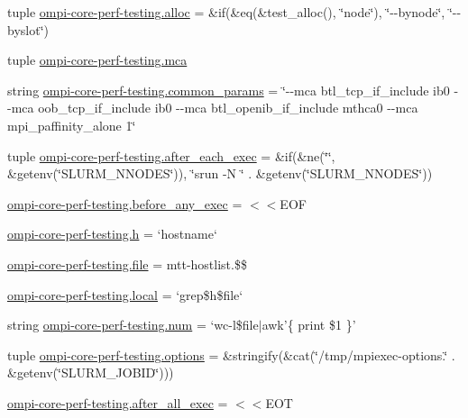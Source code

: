\begin{DoxyCompactItemize}
\item 
tuple \hyperlink{namespaceompi-core-perf-testing_aa210dffd33a5cf9389d7f932dc991a52}{ompi-\/core-\/perf-\/testing.\-alloc} = \&if(\&eq(\&test\-\_\-alloc(), \char`\"{}node\char`\"{}), \char`\"{}-\/-\/bynode\char`\"{}, \char`\"{}-\/-\/byslot\char`\"{})
\item 
tuple \hyperlink{namespaceompi-core-perf-testing_a3057dee49d2981bae3a0bc69987f7b43}{ompi-\/core-\/perf-\/testing.\-mca}
\item 
string \hyperlink{namespaceompi-core-perf-testing_a00f59b40a472bd6d479927e1bce80827}{ompi-\/core-\/perf-\/testing.\-common\-\_\-params} = \char`\"{}-\/-\/mca btl\-\_\-tcp\-\_\-if\-\_\-include ib0 -\/-\/mca oob\-\_\-tcp\-\_\-if\-\_\-include ib0 -\/-\/mca btl\-\_\-openib\-\_\-if\-\_\-include mthca0 -\/-\/mca mpi\-\_\-paffinity\-\_\-alone 1\char`\"{}
\item 
tuple \hyperlink{namespaceompi-core-perf-testing_ab2e32038b326d667da911a49949a9895}{ompi-\/core-\/perf-\/testing.\-after\-\_\-each\-\_\-exec} = \&if(\&ne(\char`\"{}\char`\"{}, \&getenv(\char`\"{}S\-L\-U\-R\-M\-\_\-\-N\-N\-O\-D\-E\-S\char`\"{})), \char`\"{}srun -\/N \char`\"{} . \&getenv(\char`\"{}S\-L\-U\-R\-M\-\_\-\-N\-N\-O\-D\-E\-S\char`\"{}))
\item 
\hyperlink{namespaceompi-core-perf-testing_a9a129769c3562f66e1c8657a148858b6}{ompi-\/core-\/perf-\/testing.\-before\-\_\-any\-\_\-exec} = $<$$<$E\-O\-F
\item 
\hyperlink{namespaceompi-core-perf-testing_a288ab27bb997a5db5f291de283963be0}{ompi-\/core-\/perf-\/testing.\-h} = `hostname`
\item 
\hyperlink{namespaceompi-core-perf-testing_ad75cfc8b0adfe42041110d8fcf748e79}{ompi-\/core-\/perf-\/testing.\-file} = mtt-\/hostlist.\$\$
\item 
\hyperlink{namespaceompi-core-perf-testing_a4a086e4123b85a46d9c48273cca50851}{ompi-\/core-\/perf-\/testing.\-local} = `grep\$h\$file`
\item 
string \hyperlink{namespaceompi-core-perf-testing_acd38c99cb54f2722bedc9c1103afeee9}{ompi-\/core-\/perf-\/testing.\-num} = `wc-\/l\$file$\vert$awk'\{ print \$1 \}'
\item 
tuple \hyperlink{namespaceompi-core-perf-testing_a760d2751fa8a987c662b192792d0e6f2}{ompi-\/core-\/perf-\/testing.\-options} = \&stringify(\&cat(\char`\"{}/tmp/mpiexec-\/options.\char`\"{} . \&getenv(\char`\"{}S\-L\-U\-R\-M\-\_\-\-J\-O\-B\-I\-D\char`\"{})))
\item 
\hyperlink{namespaceompi-core-perf-testing_ac417c6de85c14980c8e81a9bb5888325}{ompi-\/core-\/perf-\/testing.\-after\-\_\-all\-\_\-exec} = $<$$<$E\-O\-T

\end{DoxyCompactItemize}
